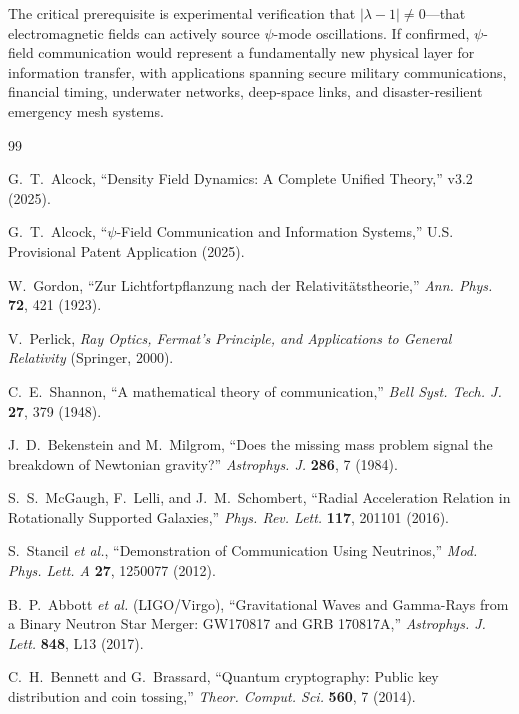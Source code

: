 \documentclass[twocolumn,superscriptaddress,prd,nofootinbib]{revtex4-2}
\begin{document}
The critical prerequisite is experimental verification that
$|\lambda - 1| \neq 0$---that electromagnetic fields can actively
source $\psi$-mode oscillations.
If confirmed, $\psi$-field communication would represent a
fundamentally new physical layer for information transfer, with
applications spanning secure military communications, financial
timing, underwater networks, deep-space links, and disaster-resilient
emergency mesh systems.


\begin{thebibliography}{99}

G.~T.~Alcock,
``Density Field Dynamics: A Complete Unified Theory,'' v3.2 (2025).

G.~T.~Alcock,
``$\psi$-Field Communication and Information Systems,''
U.S. Provisional Patent Application (2025).

W.~Gordon,
``Zur Lichtfortpflanzung nach der Relativit\"atstheorie,''
\textit{Ann. Phys.} \textbf{72}, 421 (1923).

V.~Perlick,
\textit{Ray Optics, Fermat's Principle, and Applications to General Relativity}
(Springer, 2000).

C.~E.~Shannon,
``A mathematical theory of communication,''
\textit{Bell Syst. Tech. J.} \textbf{27}, 379 (1948).

J.~D.~Bekenstein and M.~Milgrom,
``Does the missing mass problem signal the breakdown of Newtonian gravity?''
\textit{Astrophys. J.} \textbf{286}, 7 (1984).

S.~S.~McGaugh, F.~Lelli, and J.~M.~Schombert,
``Radial Acceleration Relation in Rotationally Supported Galaxies,''
\textit{Phys. Rev. Lett.} \textbf{117}, 201101 (2016).

S.~Stancil \textit{et al.},
``Demonstration of Communication Using Neutrinos,''
\textit{Mod. Phys. Lett. A} \textbf{27}, 1250077 (2012).

B.~P.~Abbott \textit{et al.} (LIGO/Virgo),
``Gravitational Waves and Gamma-Rays from a Binary Neutron Star Merger: GW170817 and GRB 170817A,''
\textit{Astrophys. J. Lett.} \textbf{848}, L13 (2017).

C.~H.~Bennett and G.~Brassard,
``Quantum cryptography: Public key distribution and coin tossing,''
\textit{Theor. Comput. Sci.} \textbf{560}, 7 (2014).


\end{thebibliography}
\end{document}
